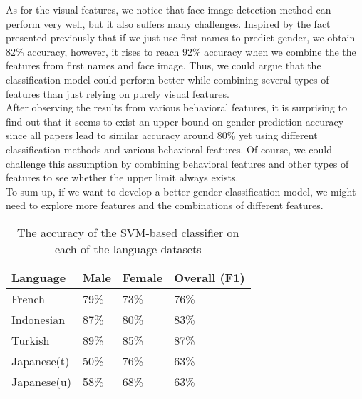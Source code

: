 \documentclass[runningheads]{llncs}
\begin{document}
	As for the visual features, we notice that face image detection method can perform very well, but it also suffers many challenges. Inspired by the fact presented previously that if we just use first names to predict gender, we obtain 82\% accuracy, however, it rises to reach 92\% accuracy when we combine the the features from first names and face image. Thus, we could argue that the classification model could perform better while combining several types of features than just relying on purely visual features. \\
	
	After observing the results from various behavioral features, it is surprising to find out that it seems to exist an upper bound on gender prediction accuracy since all papers lead to similar accuracy around 80\% yet using different classification methods and various behavioral features. Of course, we could challenge this assumption by combining behavioral features and other types of features to see whether the upper limit always exists. \\
	
	To sum up, if we want to develop a better gender classification model, we might need to explore more features and the combinations of different features.
	
	\begin{table}
		\centering
		\caption{The accuracy of the SVM-based classifier on each of the language datasets }
		\begin{tabular}{| x{2cm} | x{2cm} | x{2cm} | x{2cm} |}
			\hline
			Language  &  Male  & Female & Overall (F1)\\
			\hline
			French & 79\% & 73\% & 76\% \\
			Indonesian & 87\% & 80\% & 83\% \\
			Turkish & 89\% & 85\% & 87\% \\
			Japanese(t) & 50\% & 76\% & 63\% \\
			Japanese(u) & 58\% & 68\% & 63\% \\
			\hline
		\end{tabular}
		\label{table:language}
	\end{table}
	
	
	
	\newpage
	
	
	
	
\end{document}
